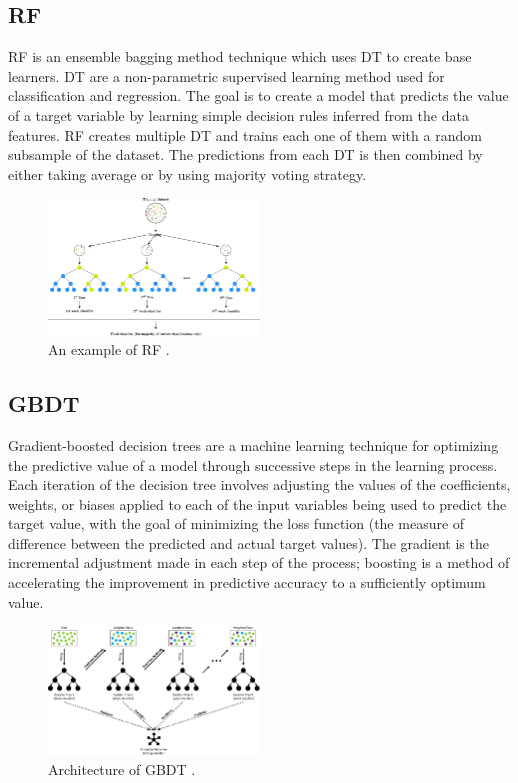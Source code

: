 \documentclass[twoside,11pt,a4paper]{article}
\begin{document}
\subsection{\acf{RF}}
\acf{RF} \citep{breiman2001random} is an ensemble bagging method technique which uses \acf{DT} to create base learners. \acs{DT} are a non-parametric supervised learning method used for classification and regression. The goal is to create a model that predicts the value of a target variable by learning simple decision rules inferred from the data features. \acs{RF} creates multiple \acs{DT} and trains each one of them with a random subsample of the dataset. The predictions from each \acs{DT} is then combined by either taking average or by using majority voting strategy.\\
\begin{figure}[ht]
	\centering
	\includegraphics[width=0.5\textwidth]{random_forest}
	\caption[An example \acs{RF}. ]{An example of \acf{RF} \cite{sapountzoglou2020fault}.}
	\label{fig:random_forest}
\end{figure}

\subsection{\acf{GBDT}}
Gradient-boosted decision trees are a machine learning technique for optimizing the predictive value of a model through successive steps in the learning process. Each iteration of the decision tree involves adjusting the values of the coefficients, weights, or biases applied to each of the input variables being used to predict the target value, with the goal of minimizing the loss function (the measure of difference between the predicted and actual target values). The gradient is the incremental adjustment made in each step of the process; boosting is a method of accelerating the improvement in predictive accuracy to a sufficiently optimum value.
\begin{figure}[ht]
	\centering
	\includegraphics[width=0.5\textwidth]{gbdt}
	\caption[Architecture of \acf{GBDT}]{Architecture of \acf{GBDT} \cite{deng2021ensemble}.}
	\label{fig:gbdt}
\end{figure}
\end{document}

